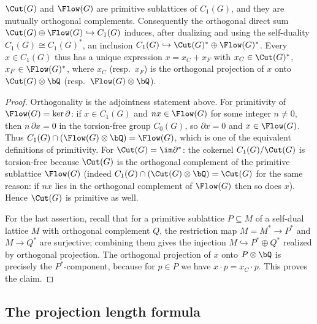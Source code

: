 
\begin{lem}\label{lem:primitive}
$\Cut(G)$ and $\Flow(G)$ are primitive sublattices of $C_1(G)$, and they are
mutually orthogonal complements. Consequently the orthogonal direct sum
$\Cut(G)\oplus\Flow(G)\hookrightarrow C_1(G)$ induces, after dualizing and using
the self-duality $C_1(G)\cong C_1(G)^{*}$, an inclusion
$C_1(G)\hookrightarrow \Cut(G)^{*}\oplus\Flow(G)^{*}$. Every $x\in C_1(G)$ thus
has a unique expression $x=x_C+x_F$ with $x_C\in\Cut(G)^{*}$,
$x_F\in\Flow(G)^{*}$, where $x_C$ (resp.\ $x_F$) is the orthogonal projection of
$x$ onto $\Cut(G)\otimes\bQ$ (resp.\ $\Flow(G)\otimes\bQ$).
\end{lem}

\begin{proof}
Orthogonality is the adjointness statement above. For primitivity of
$\Flow(G)=\ker\partial$: if $x\in C_1(G)$ and $nx\in\Flow(G)$ for some integer
$n\neq0$, then $n\,\partial x=0$ in the torsion-free group $C_0(G)$, so
$\partial x=0$ and $x\in\Flow(G)$. Thus
$C_1(G)\cap(\Flow(G)\otimes\bQ)=\Flow(G)$, which is one of the equivalent
definitions of primitivity. For $\Cut(G)=\im\partial^{*}$: the cokernel
$C_1(G)/\Cut(G)$ is torsion-free because $\Cut(G)$ is the orthogonal complement
of the primitive sublattice $\Flow(G)$ (indeed
$C_1(G)\cap(\Cut(G)\otimes\bQ)=\Cut(G)$ for the same reason: if $nx$ lies in the
orthogonal complement of $\Flow(G)$ then so does $x$). Hence $\Cut(G)$ is
primitive as well.

For the last assertion, recall that for a primitive sublattice $P\subseteq M$ of
a self-dual lattice $M$ with orthogonal complement $Q$, the restriction map
$M=M^{*}\to P^{*}$ and $M\to Q^{*}$ are surjective; combining them gives the
injection $M\hookrightarrow P^{*}\oplus Q^{*}$ realized by orthogonal
projection. The orthogonal projection of $x$ onto $P\otimes\bQ$ is precisely the
$P^{*}$-component, because for $p\in P$ we have $x\cdot p=x_C\cdot p$. This
proves the claim.
\end{proof}


\subsection*{The projection length formula}

